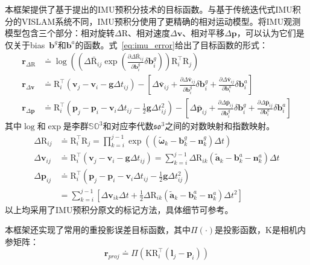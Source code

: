 本框架提供了基于提出的IMU预积分技术的目标函数。与基于传统迭代式IMU积分的VISLAM系统不同，IMU预积分使用了更精确的相对运动模型。将IMU观测模型包含三个部分：相对旋转$\Delta\mathrm{R}$、相对速度$\Delta\bm{v}$、相对平移$\Delta\bm{p}$，可以认为它们是仅关于bias~$\bm{b}^g$和$\bm{b}^a$的函数。式~\eqref{eq:imu_error}给出了目标函数的形式：
\begin{equation}
\begin{aligned}
  \bm{r}_{\Delta\mathrm{R}}
    &\doteq
      \log\left(
        \left(
          \Delta\bar{\mathrm R}_{ij}
          \exp\left(
            \tfrac{\partial\Delta\bar{\mathrm R}_{ij}}{\partial\bm{b}^g_i}
            \delta\bm{b}^g_i\right)
        \right) \mathrm{R}^\top_i \mathrm{R}_j
      \right) \\
  \bm{r}_{\Delta\bm{v}}
    &\doteq
      \mathrm{R}^\top_i(\bm{v}_j - \bm{v}_i - \bm{g}\Delta t_{ij}) -
      \left[
        \Delta\bar{\bm v}_{ij} +
        \tfrac{\partial\Delta\bar{\bm v}_{ij}}{\partial\bm{b}^g_i}
        \delta\bm{b}^g_i +
        \tfrac{\partial\Delta\bar{\bm v}_{ij}}{\partial\bm{b}^a_i}
        \delta\bm{b}^a_i
      \right] \\
  \bm{r}_{\Delta\bm{p}}
    &\doteq
      \mathrm{R}^\top_i(
        \bm{p}_j - \bm{p}_i -
        \bm{v}_i \Delta t_{ij} -
        \tfrac{1}{2}\bm{g}\Delta t^2_{ij}) -
      \left[
        \Delta\bar{\bm p}_{ij} +
        \tfrac{\partial\Delta\bar{\bm p}_{ij}}{\partial\bm{b}^g_i}
        \delta\bm{b}^g_i +
        \tfrac{\partial\Delta\bar{\bm p}_{ij}}{\partial\bm{b}^a_i}
        \delta\bm{b}^a_i \right]
\end{aligned}\label{eq:imu_error}
\end{equation}
其中$\log$和$\exp$是李群$\mathbb{SO}^3$和对应李代数$\mathfrak{so}^3$之间的对数映射和指数映射。
\begin{equation}
\begin{aligned}
    \Delta\mathrm{R}_{ij}
  &\doteq \mathrm{R}_i^\top \mathrm{R}_j
  = \prod_{k=i}^{j-1}
  \exp\left(
      (\tilde{\bm \omega}_k - \bm{b}_k^g - \bm{n}_k^g) \Delta t
  \right) \\
  \Delta\bm{v}_{ij}
  &\doteq \mathrm{R}_i^\top (\bm{v}_j - \bm{v}_i - \bm{g} \Delta t_{ij})
  = \sum_{k=i}^{j-1}
  \Delta\mathrm{R}_{ik}
  (\tilde{\bm a}_k - \bm{b}_k^a - \bm{n}_k^a) \Delta t \\
  \Delta\bm{p}_{ij}
  &\doteq \mathrm{R}_i^\top
  \left(
      \bm{p}_j - \bm{p}_i -
      \bm{v}_i \Delta t_{ij} -
      \tfrac{1}{2} \bm{g} \Delta t_{ij}^2
  \right) \\
  &= \sum_{k=i}^{j-1}
  \left[
      \Delta\bm{v}_{ik} \Delta t +
      \tfrac{1}{2} \Delta\mathrm{R}_{ik}
      (\tilde{\bm a}_k - \bm{b}_k^a - \bm{n}_k^a) \Delta t^2
  \right]
\end{aligned}\label{eq:raw_int}
\end{equation}
以上均采用了IMU预积分原文的标记方法，具体细节可参考。

本框架还实现了常用的重投影误差目标函数，其中$\Pi(\cdot)$是投影函数，$\mathrm{K}$是相机内参矩阵：
\begin{equation}
    \bm{r}_{proj} \doteq \Pi
    \left( \mathrm{K} \mathrm{R}^\top_i (\bm{l}_j - \bm{p}_i) \right)
\end{equation}
